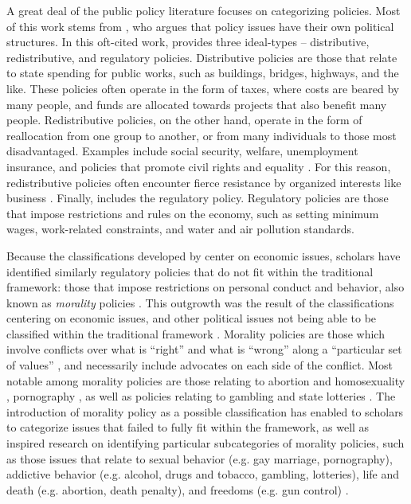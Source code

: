 A great deal of the public policy literature focuses on categorizing policies. Most of this work stems from \citet{lowi_1964,lowi_1969}, who argues that policy issues have their own political structures. In this oft-cited work, \citet{lowi_1964} provides three ideal-types -- distributive, redistributive, and regulatory policies. Distributive policies are those that relate to state spending for public works, such as buildings, bridges, highways, and the like. These policies often operate in the form of taxes, where costs are beared by many people, and funds are allocated towards projects that also benefit many people. Redistributive policies, on the other hand, operate in the form of reallocation from one group to another, or from many individuals to those most disadvantaged. Examples include social security, welfare, unemployment insurance, and policies that promote civil rights and equality \citep{hicks_1999,korpi_1983}. For this reason, redistributive policies often encounter fierce resistance by organized interests like business \citep{amenta_and_halfmann_2000,amenta_and_elliott_2019}. Finally, \citet{lowi_1964} includes the regulatory policy. Regulatory policies are those that impose restrictions and rules on the economy, such as setting minimum wages, work-related constraints, and water and air pollution standards. 

Because the classifications developed by \citet{lowi_1964} center on economic issues, scholars have identified similarly regulatory policies that do not fit within the traditional framework: those that impose restrictions on personal conduct and behavior, also known as \textit{morality} policies \citep{mooney_and_schuldt_2008}. This outgrowth was the result of the \citet{lowi_1964} classifications centering on economic issues, and other political issues not being able to be classified within the traditional framework \citep{mooney_and_schuldt_2008}. Morality policies are those which involve conflicts over what is ``right'' and what is ``wrong'' along a ``particular set of values'' \citep[675]{mooney_1999}, and necessarily include advocates on each side of the conflict. Most notable among morality policies are those relating to abortion and homosexuality \citep{camobreco_and_barnello_2018,haider_markel_1999,haider_markel_and_meier_1996}, pornography \citep{brisbin_2001,smith_2001}, as well as policies relating to gambling and state lotteries \citep{pierce_and_miller_2004,von_herrmann_2002,pierce_and_miller_1999,berry_and_berry_1990}. The introduction of morality policy as a possible classification has enabled to scholars to categorize issues that failed to fully fit within the \citet{lowi_1964} framework, as well as inspired research on identifying particular subcategories of morality policies, such as those issues that relate to sexual behavior (e.g. gay marriage, pornography), addictive behavior (e.g. alcohol, drugs and tobacco, gambling, lotteries), life and death (e.g. abortion, death penalty), and freedoms (e.g. gun control) \citep{mooney_2001}. 

